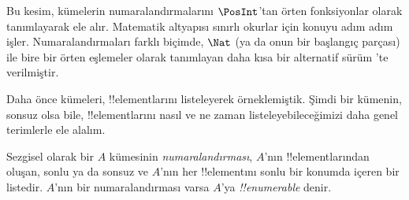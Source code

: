 \documentclass[../../../include/open-logic-section]{subfiles}
\begin{document}


\begin{editorial}
  Bu kesim, kümelerin numaralandırmalarını $\PosInt$'tan örten fonksiyonlar
  olarak tanımlayarak ele alır. Matematik altyapısı sınırlı okurlar için
  konuyu adım adım işler. Numaralandırmaları farklı biçimde, $\Nat$ (ya da
  onun bir başlangıç parçası) ile bire bir örten eşlemeler olarak tanımlayan
  daha kısa bir alternatif sürüm 'te verilmiştir.
\end{editorial}

\begin{explain}
Daha önce kümeleri, !!{element}larını listeleyerek örneklemiştik. Şimdi bir
kümenin, sonsuz olsa bile, !!{element}larını nasıl ve ne zaman
listeleyebileceğimizi daha genel terimlerle ele alalım.
\end{explain}

\begin{defn}
Sezgisel olarak bir $A$ kümesinin \emph{numaralandırması}, $A$'nın
!!{element}larından oluşan, sonlu ya da sonsuz ve $A$'nın her !!{element}ını
sonlu bir konumda içeren bir listedir. $A$'nın bir numaralandırması varsa
$A$'ya \emph{!!{enumerable}} denir.
\end{defn}
\end{document}
